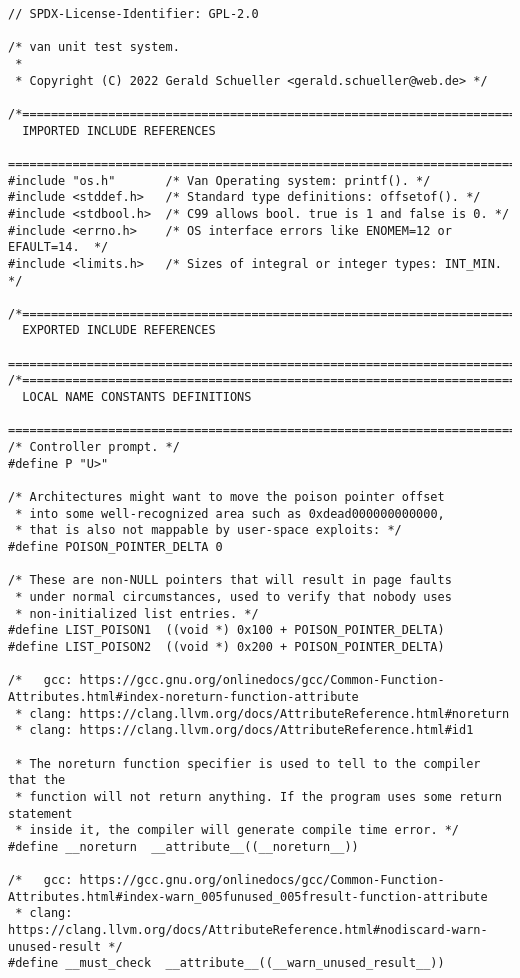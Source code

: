 \documentclass{article}
\begin{document}
\begin{lstlisting}[style=CStyle]
// SPDX-License-Identifier: GPL-2.0

/* van unit test system.
 *
 * Copyright (C) 2022 Gerald Schueller <gerald.schueller@web.de> */

/*============================================================================
  IMPORTED INCLUDE REFERENCES
  ============================================================================*/
#include "os.h"       /* Van Operating system: printf(). */
#include <stddef.h>   /* Standard type definitions: offsetof(). */
#include <stdbool.h>  /* C99 allows bool. true is 1 and false is 0. */
#include <errno.h>    /* OS interface errors like ENOMEM=12 or EFAULT=14.  */
#include <limits.h>   /* Sizes of integral or integer types: INT_MIN. */

/*============================================================================
  EXPORTED INCLUDE REFERENCES
  ============================================================================*/
/*============================================================================
  LOCAL NAME CONSTANTS DEFINITIONS
  ============================================================================*/
/* Controller prompt. */
#define P "U>"

/* Architectures might want to move the poison pointer offset
 * into some well-recognized area such as 0xdead000000000000,
 * that is also not mappable by user-space exploits: */
#define POISON_POINTER_DELTA 0

/* These are non-NULL pointers that will result in page faults
 * under normal circumstances, used to verify that nobody uses
 * non-initialized list entries. */
#define LIST_POISON1  ((void *) 0x100 + POISON_POINTER_DELTA)
#define LIST_POISON2  ((void *) 0x200 + POISON_POINTER_DELTA)

/*   gcc: https://gcc.gnu.org/onlinedocs/gcc/Common-Function-Attributes.html#index-noreturn-function-attribute
 * clang: https://clang.llvm.org/docs/AttributeReference.html#noreturn
 * clang: https://clang.llvm.org/docs/AttributeReference.html#id1

 * The noreturn function specifier is used to tell to the compiler that the
 * function will not return anything. If the program uses some return statement
 * inside it, the compiler will generate compile time error. */
#define __noreturn  __attribute__((__noreturn__))

/*   gcc: https://gcc.gnu.org/onlinedocs/gcc/Common-Function-Attributes.html#index-warn_005funused_005fresult-function-attribute
 * clang: https://clang.llvm.org/docs/AttributeReference.html#nodiscard-warn-unused-result */
#define __must_check  __attribute__((__warn_unused_result__))


\end{lstlisting}
\end{document}
